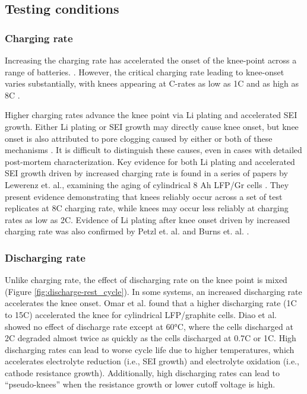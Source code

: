 \documentclass[journal=jpclcd,manuscript=article]{achemso}
\begin{document}
\subsection{Testing conditions}

\subsubsection{Charging rate}
Increasing the charging rate has accelerated the onset of the knee-point across a range of batteries. \cite{lewerenz_systematic_2017,lewerenz_post-mortem_2017, petzl_lithium_2015, burns_-situ_2015, waldmann_optimization_2015, schuster_nonlinear_2015, severson_data-driven_2019, schindler_fast_2018, keil_linear_2019}. However, the critical charging rate leading to knee-onset varies substantially, with knees appearing at C-rates as low as 1C \cite{waldmann_optimization_2015} and as high as 8C \cite{lewerenz_systematic_2017}. 

Higher charging rates advance the knee point via Li plating and accelerated SEI growth. Either Li plating or SEI growth may directly cause knee onset, but knee onset is also attributed to pore clogging caused by either or both of these mechanisms \cite{yang_modeling_2017}. It is difficult to distinguish these causes, even in cases with detailed post-mortem characterization. Key evidence for both Li plating and accelerated SEI growth driven by increased charging rate is found in a series of papers by Lewerenz et. al., examining the aging of cylindrical 8 Ah LFP/Gr cells \cite{lewerenz_systematic_2017,lewerenz_post-mortem_2017}. They present evidence demonstrating that knees reliably occur across a set of test replicates at 8C charging rate, while knees may occur less reliably at charging rates as low as 2C. Evidence of Li plating after knee onset driven by increased charging rate was also confirmed by Petzl et. al. \cite{petzl_lithium_2015} and Burns et. al. \cite{burns_-situ_2015}. 



\subsubsection{Discharging rate}

Unlike charging rate, the effect of discharging rate on the knee point is mixed (Figure \ref{fig:discharge-rest_cycle}).
In some systems, an increased discharging rate
accelerates the knee onset.
Omar et al.\cite{omar_lithium_2014} found that a higher discharging rate (1C to 15C) accelerated the knee for cylindrical LFP/graphite cells.
Diao et al.\cite{diao_accelerated_2019} showed no effect of discharge rate except at 60°C, where the cells discharged at 2C degraded almost twice as quickly as the cells discharged at 0.7C or 1C.
High discharging rates can lead to worse cycle life due to higher temperatures, which accelerates electrolyte reduction (i.e., SEI growth) and electrolyte oxidation (i.e., cathode resistance growth). Additionally, high discharging rates can lead to ``pseudo-knees'' when the resistance growth or lower cutoff voltage is high.
\end{document}
